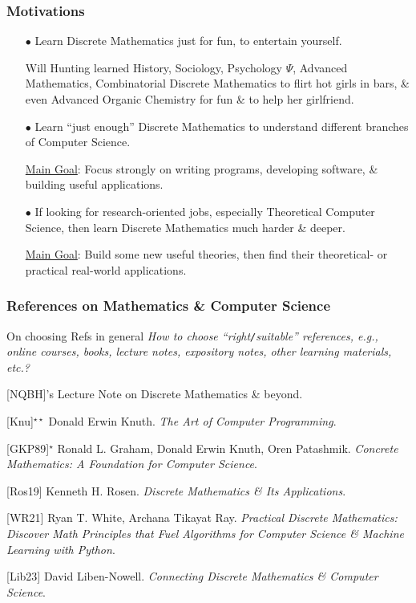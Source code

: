 \documentclass{beamer}
\begin{document}
\begin{frame}
	\frametitle{Motivations}
	\begin{itemize}
		\item[$\bullet$] Learn Discrete Mathematics just for fun, to entertain yourself.
		
		\begin{example}
			{\sc Will Hunting} learned History, Sociology, Psychology $\Psi$, Advanced Mathematics, Combinatorial Discrete Mathematics to flirt hot girls in bars, \& even Advanced Organic Chemistry for fun \& to help her girlfriend.
		\end{example}
		
		\item[$\bullet$] Learn ``just enough'' Discrete Mathematics to understand different branches of Computer Science.
		
		\underline{Main Goal}: Focus strongly on writing programs, developing software, \& building useful applications.
		\item[$\bullet$] If looking for {\color{red} research-oriented} jobs, especially {\color{red} Theoretical Computer Science}, then learn Discrete Mathematics much harder \& deeper.
		
		\underline{Main Goal}: Build some new useful theories, then find their theoretical- or practical real-world applications.
	\end{itemize}
\end{frame}

\begin{frame}
	\frametitle{References on Mathematics \& Computer Science}
	\begin{block}{On choosing Refs in general}\it
		How to choose ``right{\tt/}suitable'' references, e.g., online courses, books, lecture notes, expository notes, other learning materials, etc.?
	\end{block}
		
	[NQBH]'s Lecture Note on Discrete Mathematics \& beyond.
	\vspace{2mm}
	
	[Knu]${}^{\star\star}$ {\sc Donald Erwin Knuth}. {\it\color{red} The Art of Computer Programming}.
	\vspace{2mm}
	
	[GKP89]${}^\star$ {\sc Ronald L. Graham, Donald Erwin Knuth, Oren Patashmik}. {\it\color{blue} Concrete Mathematics: A Foundation for Computer Science}.
	\vspace{2mm}
	
	[Ros19] {\sc Kenneth H. Rosen}. {\it Discrete Mathematics \& Its Applications}.
	\vspace{2mm}
	
	[WR21] {\sc Ryan T. White, Archana Tikayat Ray}. {\it Practical Discrete Mathematics: Discover Math Principles that Fuel Algorithms for Computer Science \& Machine Learning with Python}.
	\vspace{2mm}
	
	[Lib23] {\sc David Liben-Nowell.} {\it Connecting Discrete Mathematics \& Computer Science}.
\end{frame}
\end{document}
